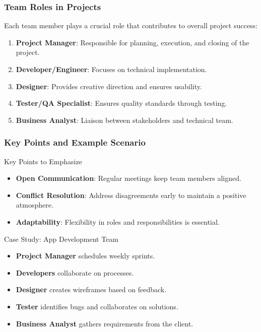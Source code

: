 \documentclass[aspectratio=169]{beamer}
\begin{document}
\begin{frame}[fragile]
    \frametitle{Team Roles in Projects}
    Each team member plays a crucial role that contributes to overall project success:
    \begin{enumerate}
        \item \textbf{Project Manager}: Responsible for planning, execution, and closing of the project.
        \item \textbf{Developer/Engineer}: Focuses on technical implementation.
        \item \textbf{Designer}: Provides creative direction and ensures usability.
        \item \textbf{Tester/QA Specialist}: Ensures quality standards through testing.
        \item \textbf{Business Analyst}: Liaison between stakeholders and technical team.
    \end{enumerate}
\end{frame}

\begin{frame}[fragile]
    \frametitle{Key Points and Example Scenario}
    \begin{block}{Key Points to Emphasize}
        \begin{itemize}
            \item \textbf{Open Communication}: Regular meetings keep team members aligned.
            \item \textbf{Conflict Resolution}: Address disagreements early to maintain a positive atmosphere.
            \item \textbf{Adaptability}: Flexibility in roles and responsibilities is essential.
        \end{itemize}
    \end{block}
    
    \begin{block}{Case Study: App Development Team}
        \begin{itemize}
            \item \textbf{Project Manager} schedules weekly sprints.
            \item \textbf{Developers} collaborate on processes.
            \item \textbf{Designer} creates wireframes based on feedback.
            \item \textbf{Tester} identifies bugs and collaborates on solutions.
            \item \textbf{Business Analyst} gathers requirements from the client.
        \end{itemize}
    \end{block}
\end{frame}
\end{document}
